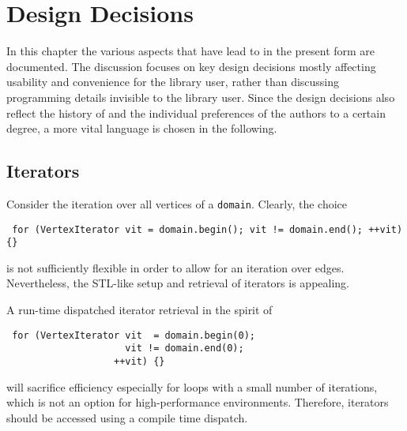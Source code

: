 \chapter{Design Decisions} \label{chap:design}
In this chapter the various aspects that have lead to {\ViennaGrid} in the present form are documented.
The discussion focuses on key design decisions mostly affecting usability and convenience for the library user,
rather than discussing programming details invisible to the library user. Since the design decisions also reflect
the history of {\ViennaGrid} and the individual preferences of the authors to a certain degree, a more vital language is chosen in the following.

 \section{Iterators}
 Consider the iteration over all vertices of a \lstinline|domain|. Clearly, the choice
 \begin{lstlisting}
 for (VertexIterator vit = domain.begin(); vit != domain.end(); ++vit) {}
 \end{lstlisting}
 is not sufficiently flexible in order to allow for an iteration over edges.
 Nevertheless, the STL-like setup and retrieval of iterators is appealing.

 A run-time dispatched iterator retrieval in the spirit of 
 \begin{lstlisting}
 for (VertexIterator vit  = domain.begin(0);
                     vit != domain.end(0);
                   ++vit) {}
 \end{lstlisting}
 will sacrifice efficiency especially for loops with a small number of iterations, which is not an option for high-performance environments. 
 Therefore, iterators should be accessed using a compile time dispatch.

